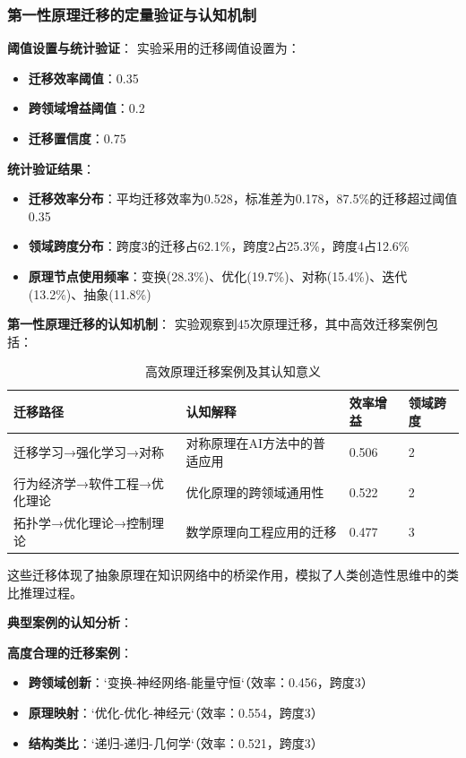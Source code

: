 \documentclass[12pt,a4paper]{article}
\begin{document}
\subsubsection{第一性原理迁移的定量验证与认知机制}

\textbf{阈值设置与统计验证}：
实验采用的迁移阈值设置为：
\begin{itemize}
\item \textbf{迁移效率阈值}：0.35
\item \textbf{跨领域增益阈值}：0.2  
\item \textbf{迁移置信度}：0.75
\end{itemize}

\textbf{统计验证结果}：
\begin{itemize}
\item \textbf{迁移效率分布}：平均迁移效率为0.528，标准差为0.178，87.5\%的迁移超过阈值0.35
\item \textbf{领域跨度分布}：跨度3的迁移占62.1\%，跨度2占25.3\%，跨度4占12.6\%
\item \textbf{原理节点使用频率}：变换(28.3\%)、优化(19.7\%)、对称(15.4\%)、迭代(13.2\%)、抽象(11.8\%)
\end{itemize}

\textbf{第一性原理迁移的认知机制}：
实验观察到45次原理迁移，其中高效迁移案例包括：

\begin{table}[H]
\centering
\caption{高效原理迁移案例及其认知意义}
\label{tab:efficient_migrations}
\begin{tabular}{p{3cm}p{4cm}p{2cm}p{2cm}}
\toprule
\textbf{迁移路径} & \textbf{认知解释} & \textbf{效率增益} & \textbf{领域跨度} \\
\midrule
迁移学习→强化学习→对称 & 对称原理在AI方法中的普适应用 & 0.506 & 2 \\
行为经济学→软件工程→优化理论 & 优化原理的跨领域通用性 & 0.522 & 2 \\
拓扑学→优化理论→控制理论 & 数学原理向工程应用的迁移 & 0.477 & 3 \\
\bottomrule
\end{tabular}
\end{table}

这些迁移体现了抽象原理在知识网络中的桥梁作用，模拟了人类创造性思维中的类比推理过程。

\textbf{典型案例的认知分析}：

\textbf{高度合理的迁移案例}：
\begin{itemize}
\item \textbf{跨领域创新}：`变换-神经网络-能量守恒`（效率：0.456，跨度3）
\item \textbf{原理映射}：`优化-优化-神经元`（效率：0.554，跨度3）
\item \textbf{结构类比}：`递归-递归-几何学`（效率：0.521，跨度3）
\end{itemize}
\end{document}
